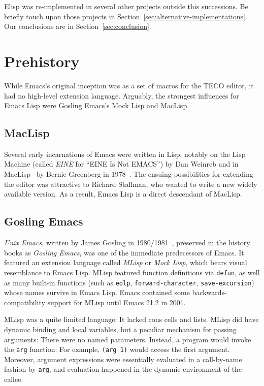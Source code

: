 \documentclass[format=acmsmall, review=false, screen=true]{acmart}
\newcommand \Elisp {Elisp}
\begin{document}
\Elisp{} was re-implemented in several other projects outside this
successions.  Be briefly touch upon those projects in
Section~\ref{sec:alternative-implementations}.  Our conclusions are in
Section~\ref{sec:conclusion}.

\section{Prehistory}
\label{sec:prehistory}

While Emacs's original inception was as a set of macros for the TECO
editor, it had no high-level extension language.  Arguably, the
strongest influences for Emacs Lisp were Gosling Emacs's Mock Lisp and
MacLisp.

\subsection{MacLisp}

Several early incarnations of Emacs were written in Lisp, notably on
the Lisp Machine (called \emph{EINE} for ``EINE Is Not EMACS'') by
Dan Weinreb and in MacLisp~\cite{Moon1974,Pitman1983} by Bernie Greenberg in
1978~\cite{Stallman2002}.  The ensuing possibilities for extending the
editor was attractive to Richard Stallman, who wanted to write a new
widely available version.  As a result, Emacs Lisp is a direct
descendant of MacLisp.


\subsection{Gosling Emacs}

\emph{Unix Emacs}, written by James Gosling in
1980/1981~\cite{Gosling1981}, preserved in the history books
as \emph{Gosling Emacs}, was one of the immediate predecessors of
Emacs.  It featured an extension language called \emph{MLisp} or
\emph{Mock Lisp}, which bears visual resemblance to Emacs Lisp.
MLisp featured function definitions via \texttt{defun}, as well as
many built-in functions (such as \texttt{eolp},
\texttt{forward-character}, \texttt{save-excursion}) whose names
survive in Emacs Lisp.  Emacs contained some backwards-compatibility
support for MLisp until Emacs 21.2 in 2001.

MLisp was a quite limited language: It lacked cons cells and lists.
MLisp did have dynamic binding and local variables, but a peculiar
mechanism for passing arguments:  There were no named
parameters.  Instead, a program would invoke the \texttt{arg}
function: For example, \texttt{(arg 1)} would access the first
argument.  Moreover, argument expressions were essentially evaluated
in a call-by-name fashion by \texttt{arg}, and evaluation happened in
the dynamic environment of the callee.
\end{document}
